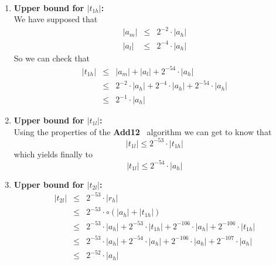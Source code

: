 \documentclass[a4paper,10pt,twoside]{article}
\newenvironment{proof}[1][Proof]{\begin{trivlist}
\item[\hskip \labelsep {\bfseries #1}]}{\end{trivlist}}
\newcommand{\hi}{\ensuremath{\mathit{h}}}
\newcommand{\mi}{\ensuremath{\mathit{m}}}
\newcommand{\lo}{\ensuremath{\mathit{l}}}
\newcommand{\Add}{{\bf Add12}}
\begin{document}
\begin{proof} ~\\
\begin{enumerate}
\item {\bf Upper bound for $\left \vert t_{1\hi} \right \vert$:}\\
We have supposed that
\begin{eqnarray*}
\left \vert a_\mi \right \vert & \leq & 2^{-2} \cdot \left \vert a_\hi \right \vert \\
\left \vert a_\lo \right \vert & \leq & 2^{-4} \cdot \left \vert a_\hi \right \vert
\end{eqnarray*}
So we can check that
\begin{eqnarray*}
\left \vert t_{1\hi} \right \vert & \leq & \left \vert a_\mi \right \vert + \left \vert a_\lo \right \vert +
2^{-54} \cdot \left \vert a_\hi \right \vert\\
& \leq & 2^{-2} \cdot \left \vert a_\hi \right \vert + 2^{-4} \cdot \left \vert a_\hi \right \vert +
2^{-54} \cdot \left \vert a_\hi \right \vert \\
& \leq & 2^{-1} \cdot \left \vert a_\hi \right \vert
\end{eqnarray*}
\item {\bf Upper bound for $\left \vert t_{1\lo} \right \vert$:}\\
Using the properties of the \Add~ algorithm we can get to know that
$$\left \vert t_{1\lo} \right \vert \leq 2^{-53} \cdot \left \vert t_{1\hi} \right \vert$$
which yields finally to
$$\left \vert t_{1\lo} \right \vert \leq 2^{-54} \cdot \left \vert a_\hi \right \vert$$
\item {\bf Upper bound for $\left \vert t_{2\lo} \right \vert$:}
\begin{eqnarray*}
\left \vert t_{2\lo} \right \vert & \leq & 2^{-53} \cdot \left \vert r_\hi \right \vert \\
& \leq & 2^{-53} \cdot \circ \left( \left \vert a_\hi \right \vert + \left \vert t_{1\hi} \right \vert \right) \\
& \leq & 2^{-53} \cdot \left \vert a_\hi \right \vert + 2^{-53} \cdot \left \vert t_{1\hi} \right \vert + 2^{-106} \cdot \left \vert a_\hi \right \vert +
2^{-106} \cdot \left \vert t_{1\hi} \right \vert \\
& \leq & 2^{-53} \cdot \left \vert a_\hi \right \vert + 2^{-54} \cdot \left \vert a_\hi \right \vert + 2^{-106} \cdot \left \vert a_\hi \right \vert +
2^{-107} \cdot \left \vert a_\hi \right \vert \\
& \leq & 2^{-52} \cdot \left \vert a_\hi \right \vert

\end{eqnarray*}
\end{enumerate}
\end{proof}
\end{document}
